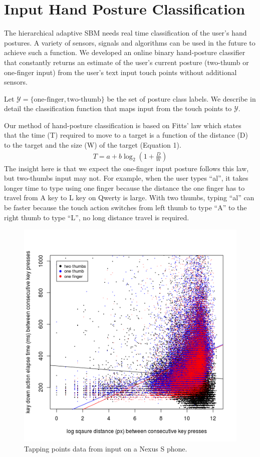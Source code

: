 \documentclass{sigchi}
\begin{document}
\section{Input Hand Posture Classification}\label{sec:posture-classification}
The hierarchical adaptive SBM needs real time classification of the user’s hand postures. A variety of sensors, signals and algorithms can be used in the future to achieve such a function. We developed an online binary hand-posture classifier 
that constantly returns an estimate of the user's current posture (two-thumb or one-finger input) from the user’s text input touch points without additional sensors. 

Let $\mathcal{Y} = \{\text{one-finger}, \text{two-thumb}\}$ be the set of posture
class labels. We describe in detail the classification function that maps input from the
touch points to $\mathcal{Y}$.

Our method of hand-posture classification is based on Fitts’ law which states that the time (T) required to move to a target is a function of the distance (D) to the target and the size (W) of the target (Equation 1).
\begin{align}
T = a + b\log_2(1 + \frac{D}{W})
\end{align}                                                  
The insight here is that we expect the one-finger input posture follows this law,  but two-thumbs input may not. For example, when the user types “al”, it takes longer time to type using one finger because the distance the one finger has to travel from A key to L key on Qwerty is large. With two thumbs, typing “al” can be faster because the touch action switches from left thumb to type “A” to the right thumb to type “L”, no long distance travel is required.

\begin{figure}[tb]
  \centering
  \includegraphics[width=0.9\columnwidth]{figures/time-distance.png}
  \caption{Tapping points data from input on a Nexus S phone.}
  \label{fig:time-distance}
\end{figure}
\end{document}
